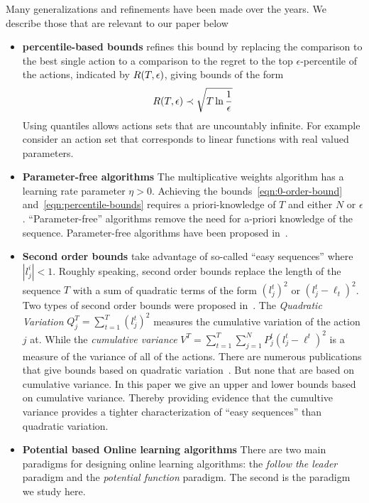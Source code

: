 \documentclass{article}[12pt]
\begin{document}
Many generalizations and refinements have been made over the years. We
describe those that are relevant to our paper below
\begin{itemize}
\item{\bf percentile-based bounds} \cite{freund1999adaptive} refines
  this bound by replacing the comparison to the best single action to
  a comparison to the regret to the top $\epsilon$-percentile of the
  actions, indicated by $R(T,\epsilon)$, giving bounds of the form
\begin{equation} \label{eqn:percentile-bounds}
R(T,\epsilon) \prec \sqrt{T \ln \frac{1}{\epsilon}}
\end{equation}
Using quantiles allows actions sets that are uncountably infinite.
For example consider an action set that corresponds to linear
functions with real valued parameters.

\item{\bf Parameter-free algorithms} The multiplicative weights
  algorithm has a learning rate parameter $\eta>0$. Achieving the
  bounds~\ref{eqn:0-order-bound} and~\ref{eqn:percentile-bounds}
  requires a priori-knowledge of $T$ and either $N$ or       
  $\epsilon$. ``Parameter-free'' algorithms remove the need for
  a-priori knowledge of the sequence. Parameter-free algorithms have
  been proposed in~\cite{chaudhuri2009parameter,
    chernov2010prediction,orabona2016coin,cutkosky2018black}.

\item{\bf Second order bounds} take advantage of so-called ``easy
  sequences'' where $|l_j^i|<1$. Roughly speaking, second order bounds
  replace the length of the sequence $T$ with a sum of quadratic terms
  of the form $(l_j^t)^2$ or $(l_j^t-\ell_t)^2$. Two types of second
  order bounds were proposed in~\cite{cesa2007improved}.  The {\em
    Quadratic Variation} $Q_j^T=\sum_{t=1}^T (l_j^t)^2$ measures the
  cumulative variation of the action $j$ at. While the {\em cumulative
    variance}
  $V^T = \sum_{t=1}^T \sum_{j=1}^N P^t_j (l_j^t - \ell^t)^2$ is a
  measure of the variance of all of the actions. There are numerous
  publications that give bounds based on quadratic
  variation~\cite{chernov2009prediction,hazan2010extracting,gaillard2014second,koolen2015second}. But
  none that are based on cumulative variance. In this paper we give an
  upper and lower bounds based on cumulative variance. Thereby
  providing evidence that the cumultive variance provides a tighter
  characterization of ``easy sequences'' than quadratic variation.
  
\item {\bf Potential based Online learning algorithms} There are two
  main paradigms for designing online learning algorithms: the {\em
    follow the leader} paradigm and the {\em potential function}
  paradigm.  The second is the paradigm we study here.  
\end{itemize}
\end{document}
